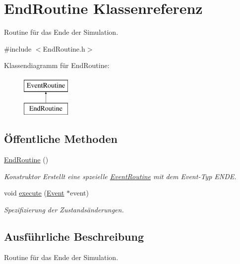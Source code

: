 \hypertarget{classEndRoutine}{}\section{End\+Routine Klassenreferenz}
\label{classEndRoutine}


Routine für das Ende der Simulation.  




{\ttfamily \#include $<$End\+Routine.\+h$>$}

Klassendiagramm für End\+Routine\+:\begin{figure}[H]
\begin{center}
\leavevmode
\includegraphics[height=2.000000cm]{classEndRoutine}
\end{center}
\end{figure}
\subsection*{Öffentliche Methoden}
\begin{DoxyCompactItemize}
\item 
\hyperlink{classEndRoutine_a3baa17a59698cc3bc695c7d9a2a85be1}{End\+Routine} ()\hypertarget{classEndRoutine_a3baa17a59698cc3bc695c7d9a2a85be1}{}\label{classEndRoutine_a3baa17a59698cc3bc695c7d9a2a85be1}

\begin{DoxyCompactList}\small\item\em Konstruktor Erstellt eine spzeielle \hyperlink{classEventRoutine}{Event\+Routine} mit dem Event-\/\+Typ E\+N\+DE. \end{DoxyCompactList}\item 
void \hyperlink{classEndRoutine_a147e1143dfec1d3fb4a58d3a6efd6641}{execute} (\hyperlink{classEvent}{Event} $\ast$event)
\begin{DoxyCompactList}\small\item\em Spezifizierung der Zustandsänderungen. \end{DoxyCompactList}\end{DoxyCompactItemize}


\subsection{Ausführliche Beschreibung}
Routine für das Ende der Simulation. 

